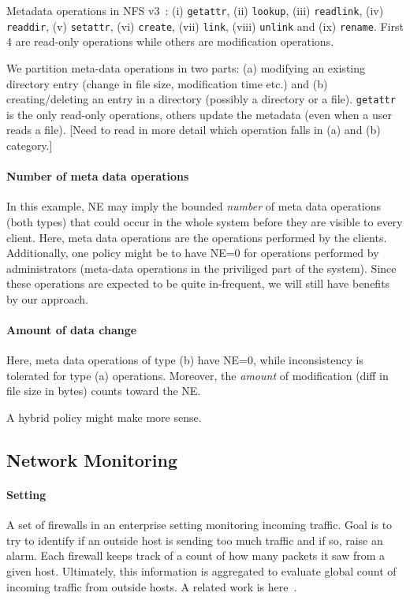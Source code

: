 \documentclass[twocolumn,10pt]{article}
\begin{document}
{Metadata operations in NFS v3~\cite{}: (i) \texttt{getattr}, (ii) \texttt{lookup}, 
(iii) \texttt{readlink}, (iv) \texttt{readdir}, (v) \texttt{setattr},
(vi) \texttt{create}, (vii) \texttt{link}, (viii) \texttt{unlink} and
(ix) \texttt{rename}. First 4 are read-only operations while others
are modification operations.

We partition meta-data operations in two parts: (a) modifying an existing directory
entry (change in file size, modification time etc.) and
(b) creating/deleting an entry in a directory (possibly a directory or a file).
\texttt{getattr} is the only read-only operations, others update the metadata
(even when a user reads a file).
[Need to read in more detail which operation falls in (a) and (b) category.]

\paragraph{Number of meta data operations} In this example, NE
may imply the bounded \textit{number} of meta data operations (both types) that could occur
in the whole system before they are visible to every client. Here, meta
data operations are the operations performed by the clients. Additionally, one policy might be
to have NE=0 for operations performed by administrators (meta-data 
operations in the priviliged part of the system). Since these operations are expected
to be quite in-frequent, we will still have benefits by our approach. 

\paragraph{Amount of data change} Here, meta data operations of type (b) have NE=0, 
while inconsistency is tolerated for type (a) operations. Moreover, the \textit{amount} of 
modification (diff in file size in bytes) counts toward the NE. 

A hybrid policy might make more sense.

\subsection{Network Monitoring}
\paragraph{Setting} A set of firewalls in an enterprise setting monitoring
incoming traffic. Goal is to try to identify if an outside host is sending
too much traffic and if so, raise an alarm. Each firewall keeps track of
a count of how many packets it saw from a given host. Ultimately, this information
is aggregated to evaluate global count of incoming traffic from outside hosts.
A related work is here~\cite{sruti-2005}.

}
\end{document}
